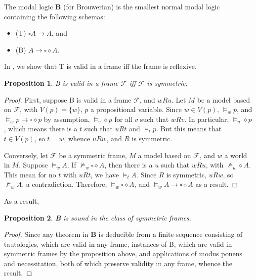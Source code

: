 \documentclass[12pt]{article}
\newtheorem{prop}{Proposition}
\begin{document}
The modal logic \textbf{B} (for Brouwerian) is the smallest normal modal logic containing the following schemas:
\begin{itemize}
\item (T) $\square A \to A$, and
\item (B) $A \to \square \diamond A$.
\end{itemize}
In , we show that T is valid in a frame iff the frame is reflexive.

\begin{prop} B is valid in a frame $\mathcal{F}$ iff $\mathcal{F}$ is symmetric. \end{prop}
\begin{proof}  First, suppose B is valid in a frame $\mathcal{F}$, and $w R u$.  Let $M$ be a model based on $\mathcal{F}$, with $V(p)=\lbrace w\rbrace$, $p$ a propositional variable.  Since $w\in V(p)$, $\models_w p$, and $\models_w p \to \square \diamond p$ by assumption, $\models_v \diamond p$ for all $v$ such that $w R v$.  In particular, $\models_u \diamond p$, which means there is a $t$ such that $u R t$ and $\models_t p$.  But this means that $t\in V(p)$, so $t=w$, whence $u R w$, and $R$ is symmetric.

Conversely, let $\mathcal{F}$ be a symmetric frame, $M$ a model based on $\mathcal{F}$, and $w$ a world in $M$.  Suppose $\models_w A$.  If $\not \models_w \square \diamond A$, then there is a $u$ such that $w R u$, with $\not \models_u \diamond A$.  This mean for no $t$ with $u R t$, we have $\models_t A$.  Since $R$ is symmetric, $u R w$, so $\not \models_w A$, a contradiction.  Therefore, $\models_w \square \diamond A$, and $\models_w A \to \square \diamond A$ as a result.
\end{proof}

As a result,
\begin{prop} \textbf{B} is sound in the class of symmetric frames. \end{prop}
\begin{proof}  Since any theorem in \textbf{B} is deducible from a finite sequence consisting of tautologies, which are valid in any frame, instances of B, which are valid in symmetric frames by the proposition above, and applications of modus ponens and necessitation, both of which preserve validity in any frame, whence the result.
\end{proof}
\end{document}
